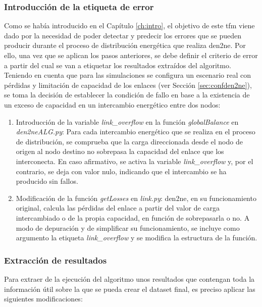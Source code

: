\subsubsection{Introducción de la etiqueta de error}
Como se había introducido en el Capítulo \ref{ch:intro}, el objetivo de este \gls{tfm} viene dado por la necesidad de poder detectar y predecir los errores que se pueden producir durante el proceso de distribución energética que realiza \gls{den2ne}. Por ello, una vez que se aplican los pasos anteriores, se debe definir el criterio de error a partir del cual se van a etiquetar los resultados extraídos del algoritmo. Teniendo en cuenta que para las simulaciones se configura un escenario real con pérdidas y limitación de capacidad de los enlaces (ver Sección \ref{sec:confden2ne}), se toma la decisión de establecer la condición de fallo en base a la existencia de un exceso de capacidad en un intercambio energético entre dos nodos:

\begin{enumerate}
    \item Introducción de la variable \textit{link\_overflow} en la función \textit{globalBalance} en \textit{den2neALG.py}: Para cada intercambio energético que se realiza en el proceso de distribución, se comprueba que la carga direccionada desde el nodo de origen al nodo destino no sobrepasa la capacidad del enlace que los interconecta. En caso afirmativo, se activa la variable \textit{link\_overflow} y, por el contrario, se deja con valor nulo, indicando que el intercambio se ha producido sin fallos. 
    \item Modificación de la función \textit{getLosses} en \textit{link.py}: \gls{den2ne}, en su funcionamiento original, calcula las pérdidas del enlace a partir del valor de carga intercambiado o de la propia capacidad, en función de sobrepasarla o no. A modo de depuración y de simplificar su funcionamiento, se incluye como argumento la etiqueta \textit{link\_overflow} y se modifica la estructura de la función.
\end{enumerate} 

\subsubsection{Extracción de resultados}
Para extraer de la ejecución del algoritmo unos resultados que contengan toda la información útil sobre la que se pueda crear el dataset final, es preciso aplicar las siguientes modificaciones:

